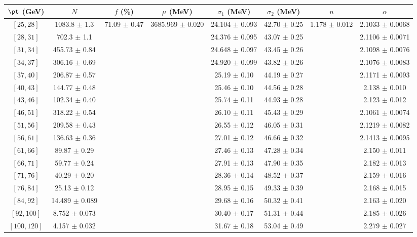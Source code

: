 \begin{tabular}{c||c|c|c|c|c|c|c}
$\pt$ (GeV) & $N$ & $f$ (\%) & $\mu$ (MeV) & $\sigma_1$ (MeV) & $\sigma_2$ (MeV) & $n$ & $\alpha$ \\
\hline
$[25, 28]$ & 1083.8 $\pm$ 1.3 & \multirow{17}{*}{71.09 $\pm$ 0.47} & \multirow{17}{*}{3685.969 $\pm$ 0.020} & 24.104 $\pm$ 0.093 & 42.70 $\pm$ 0.25 & \multirow{17}{*}{1.178 $\pm$ 0.012} & 2.1033 $\pm$ 0.0068\\
$[28, 31]$ & 702.3 $\pm$ 1.1 &  &  & 24.376 $\pm$ 0.095 & 43.07 $\pm$ 0.25 &  & 2.1106 $\pm$ 0.0071\\
$[31, 34]$ & 455.73 $\pm$ 0.84 &  &  & 24.648 $\pm$ 0.097 & 43.45 $\pm$ 0.26 &  & 2.1098 $\pm$ 0.0076\\
$[34, 37]$ & 306.16 $\pm$ 0.69 &  &  & 24.920 $\pm$ 0.099 & 43.82 $\pm$ 0.26 &  & 2.1076 $\pm$ 0.0083\\
$[37, 40]$ & 206.87 $\pm$ 0.57 &  &  & 25.19 $\pm$ 0.10 & 44.19 $\pm$ 0.27 &  & 2.1171 $\pm$ 0.0093\\
$[40, 43]$ & 144.77 $\pm$ 0.48 &  &  & 25.46 $\pm$ 0.10 & 44.56 $\pm$ 0.28 &  & 2.138 $\pm$ 0.010\\
$[43, 46]$ & 102.34 $\pm$ 0.40 &  &  & 25.74 $\pm$ 0.11 & 44.93 $\pm$ 0.28 &  & 2.123 $\pm$ 0.012\\
$[46, 51]$ & 318.22 $\pm$ 0.54 &  &  & 26.10 $\pm$ 0.11 & 45.43 $\pm$ 0.29 &  & 2.1061 $\pm$ 0.0074\\
$[51, 56]$ & 209.58 $\pm$ 0.43 &  &  & 26.55 $\pm$ 0.12 & 46.05 $\pm$ 0.31 &  & 2.1219 $\pm$ 0.0082\\
$[56, 61]$ & 136.63 $\pm$ 0.36 &  &  & 27.01 $\pm$ 0.12 & 46.66 $\pm$ 0.32 &  & 2.1413 $\pm$ 0.0095\\
$[61, 66]$ & 89.87 $\pm$ 0.29 &  &  & 27.46 $\pm$ 0.13 & 47.28 $\pm$ 0.34 &  & 2.150 $\pm$ 0.011\\
$[66, 71]$ & 59.77 $\pm$ 0.24 &  &  & 27.91 $\pm$ 0.13 & 47.90 $\pm$ 0.35 &  & 2.182 $\pm$ 0.013\\
$[71, 76]$ & 40.29 $\pm$ 0.20 &  &  & 28.36 $\pm$ 0.14 & 48.52 $\pm$ 0.37 &  & 2.159 $\pm$ 0.016\\
$[76, 84]$ & 25.13 $\pm$ 0.12 &  &  & 28.95 $\pm$ 0.15 & 49.33 $\pm$ 0.39 &  & 2.168 $\pm$ 0.015\\
$[84, 92]$ & 14.489 $\pm$ 0.089 &  &  & 29.68 $\pm$ 0.16 & 50.32 $\pm$ 0.41 &  & 2.163 $\pm$ 0.020\\
$[92, 100]$ & 8.752 $\pm$ 0.073 &  &  & 30.40 $\pm$ 0.17 & 51.31 $\pm$ 0.44 &  & 2.185 $\pm$ 0.026\\
$[100, 120]$ & 4.157 $\pm$ 0.032 &  &  & 31.67 $\pm$ 0.18 & 53.04 $\pm$ 0.49 &  & 2.279 $\pm$ 0.027\\
\end{tabular}
